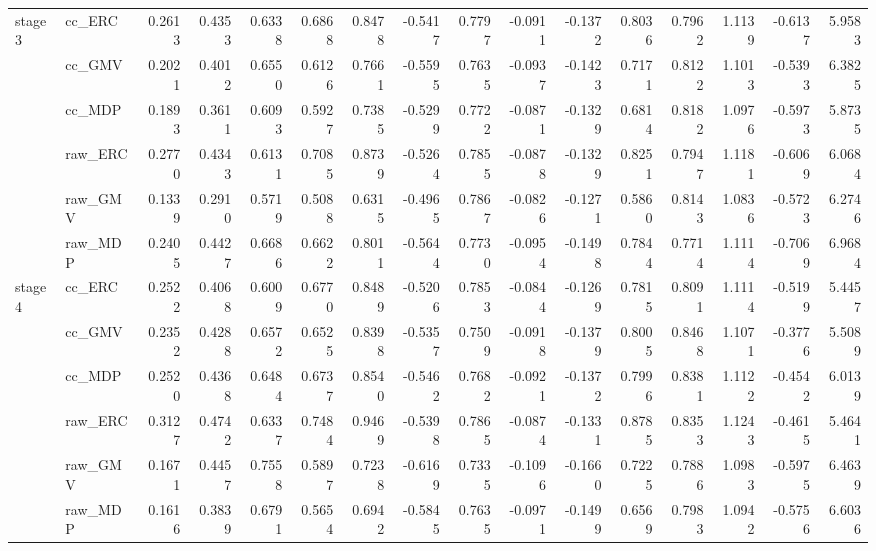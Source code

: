 \begin{tabular}{llrrrrrrrrrrrrrr}
\cline{1-16}
\multirow[t]{6}{*}{stage3} & cc_ERC & 0.2613 & 0.4353 & 0.6338 & 0.6868 & 0.8478 & -0.5417 & 0.7797 & -0.0911 & -0.1372 & 0.8036 & 0.7962 & 1.1139 & -0.6137 & 5.9583 \\
 & cc_GMV & 0.2021 & 0.4012 & 0.6550 & 0.6126 & 0.7661 & -0.5595 & 0.7635 & -0.0937 & -0.1423 & 0.7171 & 0.8122 & 1.1013 & -0.5393 & 6.3825 \\
 & cc_MDP & 0.1893 & 0.3611 & 0.6093 & 0.5927 & 0.7385 & -0.5299 & 0.7722 & -0.0871 & -0.1329 & 0.6814 & 0.8182 & 1.0976 & -0.5973 & 5.8735 \\
 & raw_ERC & 0.2770 & 0.4343 & 0.6131 & 0.7085 & 0.8739 & -0.5264 & 0.7855 & -0.0878 & -0.1329 & 0.8251 & 0.7947 & 1.1181 & -0.6069 & 6.0684 \\
 & raw_GMV & 0.1339 & 0.2910 & 0.5719 & 0.5088 & 0.6315 & -0.4965 & 0.7867 & -0.0826 & -0.1271 & 0.5860 & 0.8143 & 1.0836 & -0.5723 & 6.2746 \\
 & raw_MDP & 0.2405 & 0.4427 & 0.6686 & 0.6622 & 0.8011 & -0.5644 & 0.7730 & -0.0954 & -0.1498 & 0.7844 & 0.7714 & 1.1114 & -0.7069 & 6.9684 \\
\cline{1-16}
\multirow[t]{6}{*}{stage4} & cc_ERC & 0.2522 & 0.4068 & 0.6009 & 0.6770 & 0.8489 & -0.5206 & 0.7853 & -0.0844 & -0.1269 & 0.7815 & 0.8091 & 1.1114 & -0.5199 & 5.4457 \\
 & cc_GMV & 0.2352 & 0.4288 & 0.6572 & 0.6525 & 0.8398 & -0.5357 & 0.7509 & -0.0918 & -0.1379 & 0.8005 & 0.8468 & 1.1071 & -0.3776 & 5.5089 \\
 & cc_MDP & 0.2520 & 0.4368 & 0.6484 & 0.6737 & 0.8540 & -0.5462 & 0.7682 & -0.0921 & -0.1372 & 0.7996 & 0.8381 & 1.1122 & -0.4542 & 6.0139 \\
 & raw_ERC & 0.3127 & 0.4742 & 0.6337 & 0.7484 & 0.9469 & -0.5398 & 0.7865 & -0.0874 & -0.1331 & 0.8785 & 0.8353 & 1.1243 & -0.4615 & 5.4641 \\
 & raw_GMV & 0.1671 & 0.4457 & 0.7558 & 0.5897 & 0.7238 & -0.6169 & 0.7335 & -0.1096 & -0.1660 & 0.7225 & 0.7886 & 1.0983 & -0.5975 & 6.4639 \\
 & raw_MDP & 0.1616 & 0.3839 & 0.6791 & 0.5654 & 0.6942 & -0.5845 & 0.7635 & -0.0971 & -0.1499 & 0.6569 & 0.7983 & 1.0942 & -0.5756 & 6.6036 \\
\cline{1-16}
\bottomrule
\end{tabular}
